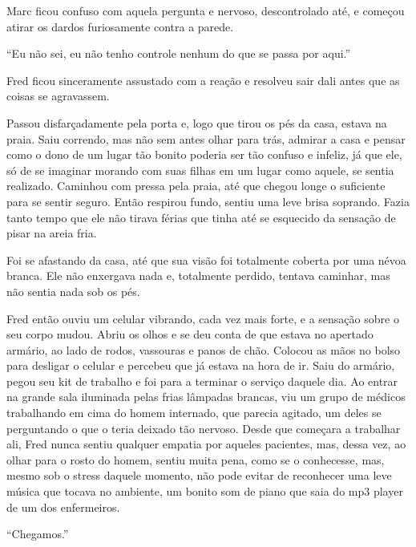 Marc ficou confuso com aquela pergunta e nervoso, descontrolado até, e
começou atirar os dardos furiosamente contra a parede.

``Eu não sei, eu não tenho controle nenhum do que se passa por aqui.''

Fred ficou sinceramente assustado com a reação e resolveu sair dali
antes que as coisas se agravassem.

Passou disfarçadamente pela porta e, logo que tirou os pés da casa,
estava na praia. Saiu correndo, mas não sem antes olhar para trás,
admirar a casa e pensar como o dono de um lugar tão bonito poderia ser
tão confuso e infeliz, já que ele, só de se imaginar morando com suas
filhas em um lugar como aquele, se sentia realizado. Caminhou com pressa
pela praia, até que chegou longe o suficiente para se sentir seguro.
Então respirou fundo, sentiu uma leve brisa soprando. Fazia tanto tempo
que ele não tirava férias que tinha até se esquecido da sensação de
pisar na areia fria.

Foi se afastando da casa, até que sua visão foi totalmente coberta por
uma névoa branca. Ele não enxergava nada e, totalmente perdido, tentava
caminhar, mas não sentia nada sob os pés.

Fred então ouviu um celular vibrando, cada vez mais forte, e a sensação
sobre o seu corpo mudou. Abriu os olhos e se deu conta de que estava no
apertado armário, ao lado de rodos, vassouras e panos de chão. Colocou
as mãos no bolso para desligar o celular e percebeu que já estava na
hora de ir. Saiu do armário, pegou seu kit de trabalho e foi para a 
terminar o serviço daquele dia. Ao entrar na grande sala iluminada pelas
frias lâmpadas brancas, viu um grupo de médicos trabalhando em cima do
homem internado, que parecia agitado, um deles se perguntando o que o
teria deixado tão nervoso. Desde que começara a trabalhar ali, Fred
nunca sentiu qualquer empatia por aqueles pacientes, mas, dessa vez, ao
olhar para o rosto do homem, sentiu muita pena, como se o conhecesse,
mas, mesmo sob o stress daquele momento, não pode evitar de reconhecer
uma leve música que tocava no ambiente, um bonito som de piano que saia
do mp3 player de um dos enfermeiros.

\asterisc


``Chegamos.''

